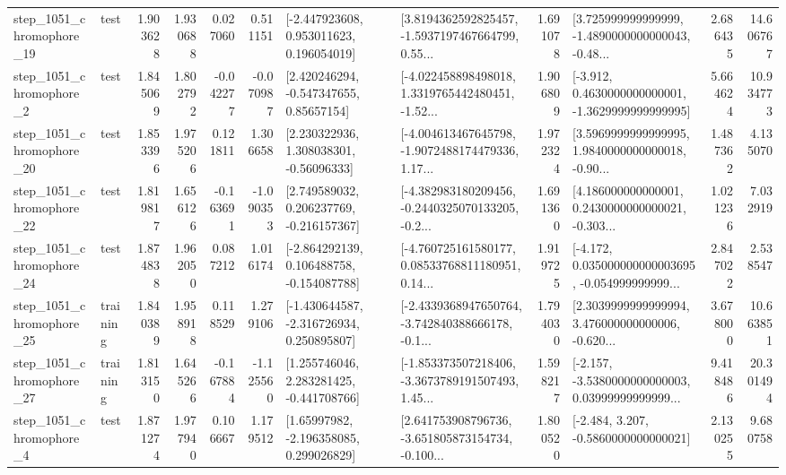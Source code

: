 \begin{tabular}{llrrrrllrlrr}
 step\_1051\_chromophore\_19 &      test &      1.903628 &    1.930688 &      0.027060 &  0.511151 &    [-2.447923608, 0.953011623, 0.196054019] &  [3.8194362592825457, -1.5937197467664799, 0.55... &       1.691078 &  [3.725999999999999, -1.4890000000000043, -0.48... &            2.686435 &         14.606767 \\
  step\_1051\_chromophore\_2 &      test &      1.845069 &    1.802792 &     -0.042277 & -0.070987 &     [2.420246294, -0.547347655, 0.85657154] &  [-4.022458898498018, 1.3319765442480451, -1.52... &       1.906809 &  [-3.912, 0.4630000000000001, -1.3629999999999995] &            5.664624 &         10.934773 \\
 step\_1051\_chromophore\_20 &      test &      1.853396 &    1.975206 &      0.121811 &  1.306658 &     [2.230322936, 1.308038301, -0.56096333] &  [-4.004613467645798, -1.9072488174479336, 1.17... &       1.972324 &  [3.5969999999999995, 1.9840000000000018, -0.90... &            1.487362 &          4.135070 \\
 step\_1051\_chromophore\_22 &      test &      1.819817 &    1.656126 &     -0.163691 & -1.090353 &    [2.749589032, 0.206237769, -0.216157367] &  [-4.382983180209456, -0.2440325070133205, -0.2... &       1.691360 &  [4.186000000000001, 0.2430000000000021, -0.303... &            1.021236 &          7.032919 \\
 step\_1051\_chromophore\_24 &      test &      1.874838 &    1.962050 &      0.087212 &  1.016174 &   [-2.864292139, 0.106488758, -0.154087788] &  [-4.760725161580177, 0.08533768811180951, 0.14... &       1.919725 &  [-4.172, 0.035000000000003695, -0.054999999999... &            2.847022 &          2.538547 \\
 step\_1051\_chromophore\_25 &  training &      1.840389 &    1.958918 &      0.118529 &  1.279106 &   [-1.430644587, -2.316726934, 0.250895807] &  [-2.4339368947650764, -3.742840388666178, -0.1... &       1.794030 &  [2.3039999999999994, 3.476000000000006, -0.620... &            3.678000 &         10.663851 \\
 step\_1051\_chromophore\_27 &  training &      1.813150 &    1.645266 &     -0.167884 & -1.125560 &    [1.255746046, 2.283281425, -0.441708766] &  [-1.853373507218406, -3.3673789191507493, 1.45... &       1.598217 &  [-2.157, -3.5380000000000003, 0.03999999999999... &            9.418486 &         20.301494 \\
  step\_1051\_chromophore\_4 &      test &      1.871274 &    1.977940 &      0.106667 &  1.179512 &     [1.65997982, -2.196358085, 0.299026829] &  [2.641753908796736, -3.651805873154734, -0.100... &       1.800520 &               [-2.484, 3.207, -0.5860000000000021] &            2.130255 &          9.680758 \\

\end{tabular}
